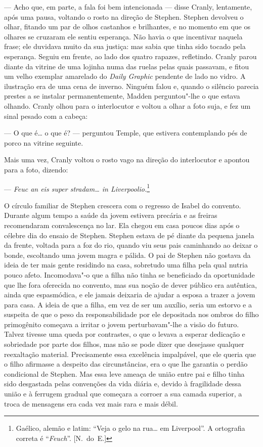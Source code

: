 --- Acho que, em parte, a fala foi bem intencionada --- disse Cranly,
lentamente, após uma pausa, voltando o rosto na direção de Stephen.  Stephen
devolveu o olhar, fitando um par de olhos castanhos e brilhantes, e no momento
em que os olhares se cruzaram ele sentiu esperança.  Não havia o que incentivar
naquela frase; ele duvidava muito da sua justiça: mas sabia que tinha sido
tocado pela esperança.  Seguiu em frente, ao lado dos quatro rapazes,
refletindo.  Cranly parou diante da vitrine de uma lojinha numa das ruelas
pelas quais passavam, e fitou um velho exemplar amarelado do \textit{Daily
Graphic} pendente de lado no vidro. A ilustração era de uma cena de inverno.
Ninguém falou e, quando o silêncio parecia prestes a se instalar
permanentemente, Madden perguntou"-lhe o que estava olhando.  Cranly olhou para
o interlocutor e voltou a olhar a foto suja, e fez um sinal pesado com a
cabeça:

--- O que é\ldots{} o que é? --- perguntou Temple, que estivera contemplando pés de
porco na vitrine seguinte.

Mais uma vez, Cranly voltou o rosto vago na direção do interlocutor e apontou
para a foto, dizendo:

--- \textit{Feuc an eis super stradam\ldots{} in Liverpoolio.}\footnote{ Gaélico,
alemão e latim: “Veja o gelo na rua\ldots{} em Liverpool”.  A ortografia correta é
“\textit{Feuch}”. [N.~do~E.]}

O círculo familiar de Stephen crescera com o regresso de Isabel do convento.
Durante algum tempo a saúde da jovem estivera precária e as freiras
recomendaram convalescença no lar.  Ela chegou em casa poucos dias após o
célebre dia do ensaio de Stephen.  Stephen estava de pé diante da pequena
janela da frente, voltada para a foz do rio, quando viu seus pais caminhando ao
deixar o bonde, escoltando uma jovem magra e pálida.  O pai de Stephen não
gostava da ideia de ter mais gente residindo na casa, sobretudo uma filha pela
qual nutria pouco afeto.  Incomodava"-o que a filha não tinha se beneficiado da
oportunidade que lhe fora oferecida no convento, mas sua noção de dever público
era autêntica, ainda que espasmódica, e ele jamais deixaria de ajudar a esposa
a trazer a jovem para casa.  A ideia de que a filha, em vez de ser um auxílio,
seria um estorvo e a suspeita de que o peso da responsabilidade por ele
depositada nos ombros do filho primogênito começava a irritar o jovem
perturbavam"-lhe a visão do futuro.  Talvez tivesse uma queda por contrastes, o
que o levava a esperar dedicação e sobriedade por parte dos filhos, mas não
se pode dizer que desejasse qualquer reexaltação material.  Precisamente essa
excelência impalpável, que ele queria que o filho afirmasse a despeito das
circunstâncias, era o que lhe garantia o perdão condicional de Stephen.  Mas
essa leve ameaça de união entre pai e filho tinha sido desgastada pelas
convenções da vida diária e, devido à fragilidade dessa união e à ferrugem
gradual que começara a corroer a sua camada superior, a troca de mensagens era
cada vez mais rara e mais débil.

